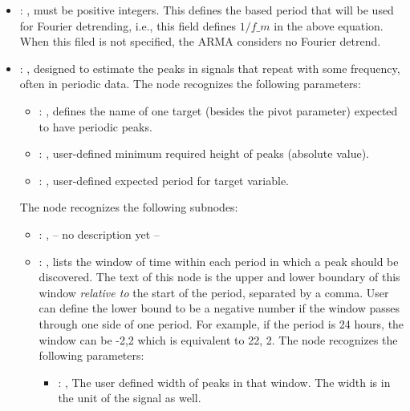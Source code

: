 \begin{itemize}
    \item {}: , 
      must be positive integers. This defines the
      based period that will be used for Fourier detrending, i.e., this
      field defines $1/f\_m$ in the above equation.
      When this filed is not specified, the ARMA considers no Fourier detrend.

    \item {}: , 
      designed to estimate the peaks in signals that repeat with some frequency,
      often in periodic data.
      The  node recognizes the following parameters:
        \begin{itemize}
          \item {}: , 
            defines the name of one target (besides the                         pivot parameter)
            expected to have periodic peaks.
          \item {}: , 
            user-defined minimum required                         height of peaks (absolute value).
          \item {}: , 
            user-defined expected period for target variable.
      \end{itemize}

      The  node recognizes the following subnodes:
      \begin{itemize}
        \item {}: , 
          -- no description yet --

        \item {}: , 
          lists the window of time within each period in which a peak should be discovered.
          The text of this node is the upper and lower boundary of this
          window \emph{relative to} the start of the period, separated by a comma.
          User can define the lower bound to be a negative
          number if the window passes through one side of one period. For example, if the period is
          24                                                  hours, the window can be -2,2 which is
          equivalent to 22, 2.
          The  node recognizes the following parameters:
            \begin{itemize}
              \item {}: , 
                The user defined  width of peaks in that window. The width is in the unit of the
                signal as well.
          \end{itemize}
      \end{itemize}


\end{itemize}
